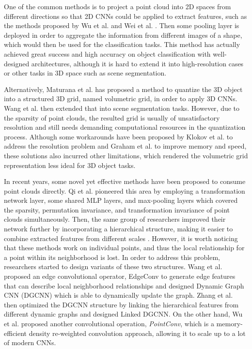 \documentclass{article}
\begin{document}
One of the common methods is to project a point cloud into 2D spaces from different directions so that 2D CNNs could be applied to extract features, such as the methods proposed by Wu et al. \cite{modelnet} and Wei et al. \cite{dense}. Then some pooling layer is deployed in order to aggregate the information from different images of a shape, which would then be used for the classification tasks. This method has actually achieved great success and high accuracy on object classification with well-designed architectures, although it is hard to extend it into high-resolution cases or other tasks in 3D space such as scene segmentation. 

Alternatively, Maturana et al. \cite{voxnet} has proposed a method to quantize the 3D object into a structured 3D grid, named volumetric grid, in order to apply 3D CNNs. Wang et al. \cite{voxseg} then extended that into scene segmentation tasks. However, due to the sparsity of point clouds, the resulted grid is usually of unsatisfactory resolution and still needs demanding computational resources in the quantization process. Although some workarounds have been proposed by Klokov et al. \cite{kd} to address the resolution problem and Graham et al. \cite{sscn} to improve memory and speed, these solutions also incurred other limitations, which rendered the volumetric grid representation less ideal for 3D object tasks.

In recent years, some novel yet effective methods have been proposed to consume point clouds directly. Qi et al. \cite{pointnet} pioneered this area by employing a transformation network layer, some shared MLP layers, and max-pooling layers which covered the sparsity, permutation invariance, and transformation invariance of point clouds simultaneously. Then, the same group of researchers improved their network further by incorporating a hierarchical structure, making it easier to combine extracted features from different scales \cite{pointnetpp}. However, it is worth noticing that these methods work on individual points, and thus the local relationship for a point within its neighborhood is lost. In order to address this problem, researchers started to design variants of these two structures. Wang et al. \cite{dgcnn} proposed an edge convolutional operator, EdgeConv to generate edge features that can describe local neighborhood relationships and designed Dynamic Graph CNN (DGCNN) which is able to dynamically update the graph. Zhang et al. \cite{ldgcnn} then optimized the DGCNN structure by linking the hierarchical features from different dynamic graphs and designed Linked DGCNN. On the other hand, Wu et al. \cite{pointconv} proposed another convolutional operation, \textit{PointConv}, which is a memory-efficient density re-weighted convolution approach, allowing it to scale up to a lot of modern CNNs.
\end{document}
